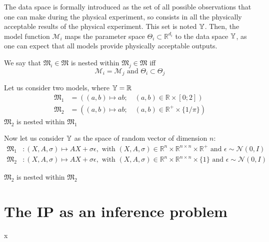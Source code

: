 \documentclass[../../Main_ManuscritThese.tex]{subfiles}
\begin{document}
The data space is formally introduced as the set of all possible observations that one can make during the physical experiment, so consists in all the physically acceptable results of the physical experiment. This set is noted $\mathbb{Y}$.
Then, the model function $\mathcal{M}_i$ maps the parameter space $\Theta_i \subset \mathbb{R}^{d_i}$ to the data space $\mathbb{Y}$, as one can expect that all models provide physically acceptable outputs.
\\
\begin{envDef}
We say that $\mathfrak{M}_i \in \mathfrak{M}$ is nested within $\mathfrak{M}_j\in\mathfrak{M}$ iff
\begin{equation}
  \mathcal{M}_i = \mathcal{M}_j \text{ and } \Theta_i \subset \Theta_j
\end{equation}
\end{envDef}
\begin{envEx}
  Let us consider two models, where $\mathbb{Y} = \mathbb{R}$
  \begin{align*}
    \mathfrak{M}_1 &= \left((a,b) \mapsto ab;\quad (a,b) \in \mathbb{R} \times [0;2]\right) \\
   \mathfrak{M}_2 &= \left((a,b) \mapsto ab;\quad (a,b) \in \mathbb{R}^+ \times \{1/\pi\}\right)
  \end{align*}
$\mathfrak{M}_2$ is nested within $\mathfrak{M}_1$
\end{envEx}
\begin{envEx}
  Now let us consider $\mathbb{Y}$ as the space of random vector of dimension $n$:
  \begin{align*}
    \mathfrak{M}_1 &: (X, A, \sigma) \mapsto AX + \sigma\epsilon, \text{ with } (X, A, \sigma)\in\mathbb{R}^n \times \mathbb{R}^{n\times n} \times \mathbb{R}^+ \text{ and } \epsilon \sim \mathcal{N}(0, I) \\
    \mathfrak{M}_2 &: (X, A, \sigma) \mapsto AX + \sigma\epsilon, \text{ with } (X, A, \sigma)\in\mathbb{R}^n \times \mathbb{R}^{n\times n} \times \{1\} \text{ and } \epsilon \sim \mathcal{N}(0, I)
  \end{align*}
\end{envEx}
$\mathfrak{M}_2$ is nested within $\mathfrak{M}_2$


\newpage
\section{The IP as an inference problem}x
\end{document}
